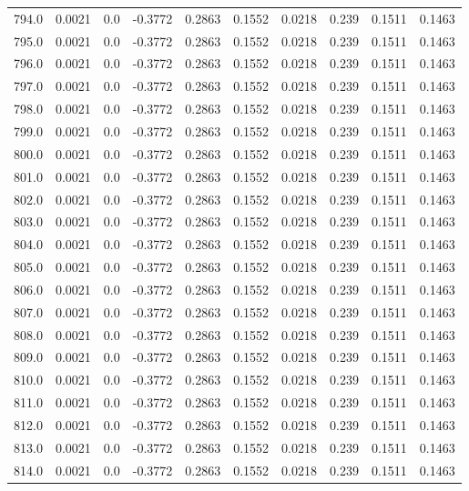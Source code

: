 \begin{longtable}{lrrrrrrrrr}
794.0 & 0.0021 & 0.0 & -0.3772 & 0.2863 & 0.1552 & 0.0218 & 0.239 & 0.1511 & 0.1463 \\
795.0 & 0.0021 & 0.0 & -0.3772 & 0.2863 & 0.1552 & 0.0218 & 0.239 & 0.1511 & 0.1463 \\
796.0 & 0.0021 & 0.0 & -0.3772 & 0.2863 & 0.1552 & 0.0218 & 0.239 & 0.1511 & 0.1463 \\
797.0 & 0.0021 & 0.0 & -0.3772 & 0.2863 & 0.1552 & 0.0218 & 0.239 & 0.1511 & 0.1463 \\
798.0 & 0.0021 & 0.0 & -0.3772 & 0.2863 & 0.1552 & 0.0218 & 0.239 & 0.1511 & 0.1463 \\
799.0 & 0.0021 & 0.0 & -0.3772 & 0.2863 & 0.1552 & 0.0218 & 0.239 & 0.1511 & 0.1463 \\
800.0 & 0.0021 & 0.0 & -0.3772 & 0.2863 & 0.1552 & 0.0218 & 0.239 & 0.1511 & 0.1463 \\
801.0 & 0.0021 & 0.0 & -0.3772 & 0.2863 & 0.1552 & 0.0218 & 0.239 & 0.1511 & 0.1463 \\
802.0 & 0.0021 & 0.0 & -0.3772 & 0.2863 & 0.1552 & 0.0218 & 0.239 & 0.1511 & 0.1463 \\
803.0 & 0.0021 & 0.0 & -0.3772 & 0.2863 & 0.1552 & 0.0218 & 0.239 & 0.1511 & 0.1463 \\
804.0 & 0.0021 & 0.0 & -0.3772 & 0.2863 & 0.1552 & 0.0218 & 0.239 & 0.1511 & 0.1463 \\
805.0 & 0.0021 & 0.0 & -0.3772 & 0.2863 & 0.1552 & 0.0218 & 0.239 & 0.1511 & 0.1463 \\
806.0 & 0.0021 & 0.0 & -0.3772 & 0.2863 & 0.1552 & 0.0218 & 0.239 & 0.1511 & 0.1463 \\
807.0 & 0.0021 & 0.0 & -0.3772 & 0.2863 & 0.1552 & 0.0218 & 0.239 & 0.1511 & 0.1463 \\
808.0 & 0.0021 & 0.0 & -0.3772 & 0.2863 & 0.1552 & 0.0218 & 0.239 & 0.1511 & 0.1463 \\
809.0 & 0.0021 & 0.0 & -0.3772 & 0.2863 & 0.1552 & 0.0218 & 0.239 & 0.1511 & 0.1463 \\
810.0 & 0.0021 & 0.0 & -0.3772 & 0.2863 & 0.1552 & 0.0218 & 0.239 & 0.1511 & 0.1463 \\
811.0 & 0.0021 & 0.0 & -0.3772 & 0.2863 & 0.1552 & 0.0218 & 0.239 & 0.1511 & 0.1463 \\
812.0 & 0.0021 & 0.0 & -0.3772 & 0.2863 & 0.1552 & 0.0218 & 0.239 & 0.1511 & 0.1463 \\
813.0 & 0.0021 & 0.0 & -0.3772 & 0.2863 & 0.1552 & 0.0218 & 0.239 & 0.1511 & 0.1463 \\
814.0 & 0.0021 & 0.0 & -0.3772 & 0.2863 & 0.1552 & 0.0218 & 0.239 & 0.1511 & 0.1463 \\

\end{longtable}
